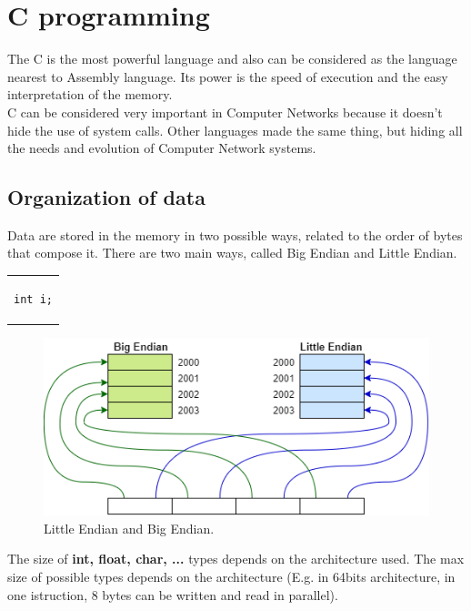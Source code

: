 \chapter{C programming}
The C is the most powerful language and also can be considered as the language nearest to Assembly language. Its power is the speed of execution and the easy interpretation of the memory.\\
C can be considered very important in Computer Networks because it doesn't hide the use of system calls. Other languages made the same thing, but hiding all the needs and evolution of Computer Network systems.

\section{Organization of data}\label{littleBig}
Data are stored in the memory in two possible ways, related to the order of bytes that compose it. There are two main ways, called Big Endian and Little Endian.
\begin{center}
\begin{tabular}{c}
\begin{lstlisting}[linewidth=30pt, basicstyle=\footnotesize\sffamily,]
int i;
\end{lstlisting}
\end{tabular}
\end{center}

\begin{figure}[h]
\centering
\includegraphics[scale=0.68]{Images/Programming/endians}
\caption{\footnotesize{Little Endian and Big Endian.}}
\end{figure}

The size of \textbf{int, float, char, ...} types
depends on the architecture used. The max size of possible types depends on the architecture (E.g. in 64bits architecture, in one istruction, 8 bytes can be written and read in parallel).

